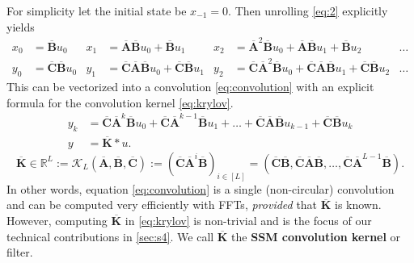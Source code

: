 For simplicity let the initial state be \( x_{-1} = 0 \).
Then unrolling \eqref{eq:2} explicitly yields %
\begin{align*}
  x_0 &= \bm{\overline{B}} u_0 &
  x_1 &= \bm{\overline{A}} \bm{\overline{B}} u_0 + \bm{\overline{B}} u_1 &
  x_2 &= \bm{\overline{A}}^2 \bm{\overline{B}} u_0 + \bm{\overline{A}} \bm{\overline{B}} u_1 + \bm{\overline{B}} u_2 & \dots
  \\
  y_0 &= \bm{\overline{C}} \bm{\overline{B}} u_0 &
  y_1 &= \bm{\overline{C}} \bm{\overline{A}} \bm{\overline{B}} u_0 + \bm{\overline{C}} \bm{\overline{B}} u_1 &
  y_2 &= \bm{\overline{C}} \bm{\overline{A}}^2 \bm{\overline{B}} u_0 + \bm{\overline{C}} \bm{\overline{A}} \bm{\overline{B}} u_1 + \bm{\overline{C}} \bm{\overline{B}} u_2
  & \dots
\end{align*}
This can be vectorized into a convolution \eqref{eq:convolution} with an explicit formula for the convolution kernel \eqref{eq:krylov}.
\begin{equation}
  \label{eq:convolution}
  \begin{split}
    y_k &= \bm{\overline{C}} \bm{\overline{A}}^k \bm{\overline{B}} u_0 + \bm{\overline{C}} \bm{\overline{A}}^{k-1} \bm{\overline{B}} u_1 + \dots + \bm{\overline{C}} \bm{\overline{A}} \bm{\overline{B}} u_{k-1} + \bm{\overline{C}}\bm{\overline{B}} u_k
    \\
    y &= \bm{\overline{K}} \ast u %
    .
  \end{split}
\end{equation}
\begin{equation}%
  \label{eq:krylov}
  \bm{\overline{K}} \in \mathbb{R}^L :=
  \mathcal{K}_L(\bm{\overline{A}}, \bm{\overline{B}}, \bm{\overline{C}}) := \left(\bm{\overline{C}} \bm{\overline{A}}^i \bm{\overline{B}}\right)_{i \in [L]} = (\bm{\overline{C}}\bm{\overline{B}}, \bm{\overline{C}}\bm{\overline{A}}\bm{\overline{B}}, \dots, \bm{\overline{C}}\bm{\overline{A}}^{L-1}\bm{\overline{B}})
  .
\end{equation}
\normalsize
In other words, equation \eqref{eq:convolution} is a single (non-circular) convolution and can be computed very efficiently with FFTs, \emph{provided} that \( \bm{\overline{K}} \) is known. %
However, computing \( \bm{\overline{K}} \) in \eqref{eq:krylov} is non-trivial and is the focus of our technical contributions in \cref{sec:s4}.
We call \( \bm{\overline{K}} \) the \textbf{SSM convolution kernel} or filter.
